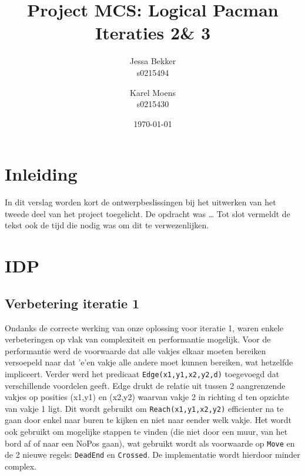\documentclass[a4paper,12pt]{article}
\title{Project MCS: Logical Pacman \\ Iteraties 2\& 3}
\author{Jessa Bekker\\s0215494 \and Karel Moens \\ s0215430 }
\date{\today}
\begin{document}
\maketitle


\section{Inleiding}
In dit verslag worden kort de ontwerpbeslissingen bij het uitwerken van het tweede deel van het project toegelicht.
De opdracht was \dots
Tot slot vermeldt de tekst ook de tijd die nodig was om dit te verwezenlijken.

\section{IDP}
\subsection{Verbetering iteratie 1}
Ondanks de correcte werking van onze oplossing voor iteratie 1, waren enkele verbeteringen op vlak van complexiteit en performantie mogelijk. Voor de performantie werd de voorwaarde dat alle vakjes elkaar moeten bereiken versoepeld naar dat 'e'en vakje alle andere moet kunnen bereiken, wat hetzelfde impliceert. Verder werd het predicaat \texttt{Edge(x1,y1,x2,y2,d)} toegevoegd dat verschillende voordelen geeft. Edge drukt de relatie uit tussen 2 aangrenzende vakjes op posities (x1,y1) en (x2,y2) waarvan vakje 2 in richting d ten opzichte van vakje 1 ligt. Dit wordt gebruikt om \texttt{Reach(x1,y1,x2,y2)} efficienter na te gaan door enkel naar buren te kijken en niet naar eender welk vakje. Het wordt ook gebruikt om mogelijke stappen te vinden (die niet door een muur, van het bord af of naar een NoPos gaan), wat gebruikt wordt als voorwaarde op \texttt{Move} en de 2 nieuwe regels: \texttt{DeadEnd} en \texttt{Crossed}. De implementatie wordt hierdoor minder complex.
\end{document}
